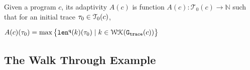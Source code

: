 \begin{defn}
    \label{def:trace_adapt}
    Given a program ${c}$, 
    its adaptivity $A(c)$ is function 
    $A(c) : \mathcal{T}_0(c)\to \mathbb{N}$ such that for an
    initial trace $\mathtt{\tau}_0 \in \mathcal{T}_0(c)$, 
\begin{center}
$
    A(c)(\mathtt{\tau}_0) = \max \big 
    \{ \mathtt{len}^{\tt q}(k)(\mathtt{\tau}_0) \mid k \in \mathcal{WK}(\mathtt{{G_{trace}}}(c)) \big \} 
$
\end{center}
\end{defn}

\subsection{The Walk Through Example}
